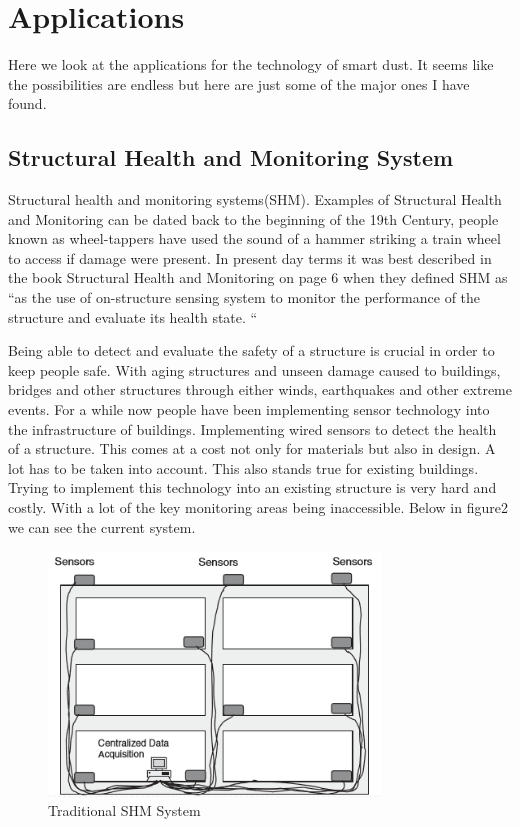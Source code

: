 \documentclass[article]{IEEEtran}
\begin{document}
\section{Applications}
Here we look at the applications for the technology of smart dust. It seems like the possibilities are endless but here are just some of the major ones I have found.

\subsection{Structural Health and Monitoring System}
Structural health and monitoring systems(SHM). Examples of Structural Health and Monitoring can be dated back to the beginning of the 19th Century, people known as wheel-tappers have used the sound of a hammer striking a train wheel to access if damage were present. In present day terms it was best described in the book Structural Health and Monitoring on page 6 when they defined SHM as “as the use of on-structure sensing system to monitor the performance   of   the   structure   and   evaluate   its   health   state. “\cite{SHM}

Being able to detect and evaluate the safety of a structure is crucial in order to keep people safe. With aging structures and unseen damage caused to buildings, bridges and other structures through either winds, earthquakes and other extreme events. For a while now people have been implementing sensor technology into the infrastructure of buildings. Implementing wired sensors to detect the health of a structure. This comes at a cost not only for materials but also in design. A lot has to be taken into account. This also stands true for existing buildings. Trying to implement this technology into an existing structure is very hard and costly. With a lot of the key monitoring areas being inaccessible. Below in figure2 we can see the current system.

\begin{figure}[h!]
\graphicspath{ {images/} }
\includegraphics[width=8.8cm, height=6.5cm]{figure2}
\caption{Traditional SHM System}
\label{Tradition SHM}
\end{figure}
\end{document}

